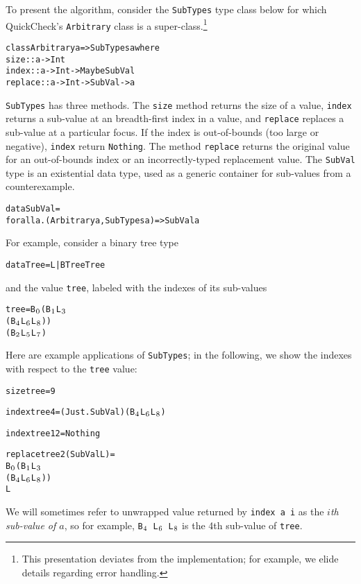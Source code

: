 \documentclass[10pt]{sigplanconf}
\newenvironment{code}{\begin{alltt}}{\end{alltt}}
\newcommand{\ttp}[1]{\texttt{#1}}
\newcommand{\sub}[1]{\(\sb{#1}\)}
\begin{document}
To present the algorithm, consider the \ttp{SubTypes} type class below for which
QuickCheck's \ttp{Arbitrary} class is a super-class.\footnote{This presentation
  deviates from the implementation; for example, we elide details regarding
  error handling.}
%
\begin{code}
class Arbitrary a => SubTypes a where
  size    :: a -> Int
  index   :: a -> Int -> Maybe SubVal
  replace :: a -> Int -> SubVal -> a
\end{code}
%
\noindent
\ttp{SubTypes} has three methods.  The \ttp{size} method returns the size of a
value, \ttp{index} returns a sub-value at an breadth-first index in a value, and
\ttp{replace} replaces a sub-value at a particular focus.  If the index is
out-of-bounds (too large or negative), \ttp{index} return \ttp{Nothing}.  The
method \ttp{replace} returns the original value for an out-of-bounds index or an
incorrectly-typed replacement value.  The \ttp{SubVal} type is an existential
data type, used as a generic container for sub-values from a counterexample.
%
\begin{code}
data SubVal = 
  forall a. (Arbitrary a, SubTypes a) => SubVal a
\end{code}
%
\noindent
For example, consider a binary tree type
%
\begin{code}
data Tree = L | B Tree Tree
\end{code}
% 
\noindent
and the value \ttp{tree}, labeled with the indexes of its sub-values
%
\begin{code}
tree = B\sub{0} (B\sub{1} L\sub{3} 
             (B\sub{4} L\sub{6} L\sub{8}))
          (B\sub{2} L\sub{5} L\sub{7})
\end{code}
%
\noindent
Here are example applications of \ttp{SubTypes}; in the following, we show
the indexes with respect to the \ttp{tree} value:
%
\begin{code}
size tree = 9

index tree 4 = (Just . SubVal) (B\sub{4} L\sub{6} L\sub{8})

index tree 12 = Nothing

replace tree 2 (SubVal L) = 
  B\sub{0} (B\sub{1} L\sub{3} 
        (B\sub{4} L\sub{6} L\sub{8}))
     L
\end{code}
%
\noindent
We will sometimes refer to unwrapped value returned by \ttp{index a i} as the
\emph{$i$th sub-value of $a$}, so for example, \ttp{B\sub{4} L\sub{6} L\sub{8}}
is the 4th sub-value of \ttp{tree}.
\end{document}
